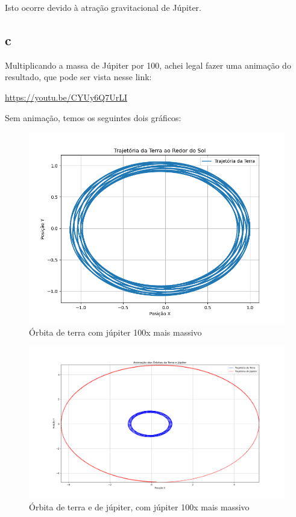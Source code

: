 \documentclass[12pt,a4paper]{article}
\begin{document}
Isto ocorre devido à atração gravitacional de Júpiter.

\subsection{c}

Multiplicando a massa de Júpiter por 100, achei legal fazer uma animação do resultado, que pode ser vista nesse link:

\url{https://youtu.be/CYUy6Q7UrLI}

Sem animação, temos os seguintes dois gráficos:

\begin{figure}[H]
\centering
\includegraphics[width=\linewidth]{../tarefa-3/terra.png}
\caption{Órbita de terra com júpiter 100x mais massivo}
\end{figure}

\begin{figure}[H]
\centering
\includegraphics[width=\linewidth]{../tarefa-3/terrajupiter100.png}
\caption{Órbita de terra e de júpiter, com júpiter 100x mais massivo}
\end{figure}
\end{document}
